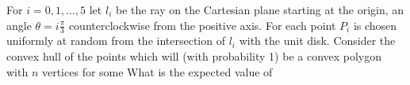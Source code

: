 For $i=0,1,\dots,5$ let $l_i$ be the ray on the Cartesian plane starting at the origin, an angle $\theta=i\frac{\pi}{3}$ counterclockwise from the positive axis. For each  point $P_i$ is chosen uniformly at random from the intersection of $l_i$ with the unit disk. Consider the convex hull of the points  which will (with probability 1) be a convex polygon with $n$ vertices for some  What is the expected value of 